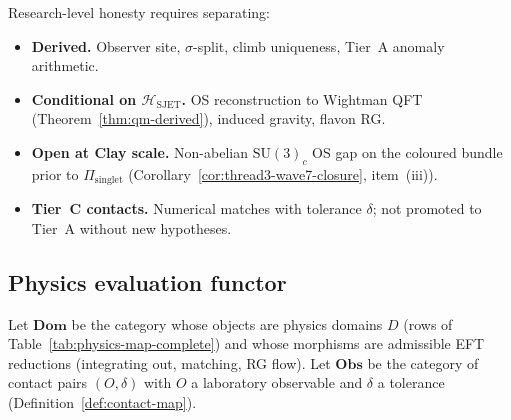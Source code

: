 \begin{remark}
\label{rmk:formal-open}
Research-level honesty requires separating:
\begin{itemize}[leftmargin=*]
  \item \textbf{Derived.} Observer site, $\sigma$-split, climb uniqueness,
    Tier~A anomaly arithmetic.
  \item \textbf{Conditional on $\mathcal{H}_{\mathrm{SJET}}$.} OS
    reconstruction to Wightman QFT (Theorem~\ref{thm:qm-derived}),
    induced gravity, flavon RG.
  \item \textbf{Open at Clay scale.} Non-abelian $\mathrm{SU}(3)_c$ OS gap on
    the coloured bundle prior to $\Pi_{\mathrm{singlet}}$
    (Corollary~\ref{cor:thread3-wave7-closure}, item~(iii)).
  \item \textbf{Tier~C contacts.} Numerical matches with tolerance $\delta$;
    not promoted to Tier~A without new hypotheses.
\end{itemize}
\end{remark}

\subsection{Physics evaluation functor}
\label{sec:formal-foundations:eval}

\begin{definition}\label{def:domain-obs}
Let $\mathbf{Dom}$ be the category whose objects are physics domains $D$
(rows of Table~\ref{tab:physics-map-complete}) and whose morphisms are
admissible EFT reductions (integrating out, matching, RG flow). Let
$\mathbf{Obs}$ be the category of contact pairs $(O,\delta)$ with $O$ a
laboratory observable and $\delta$ a tolerance (Definition~\ref{def:contact-map}).
\end{definition}

